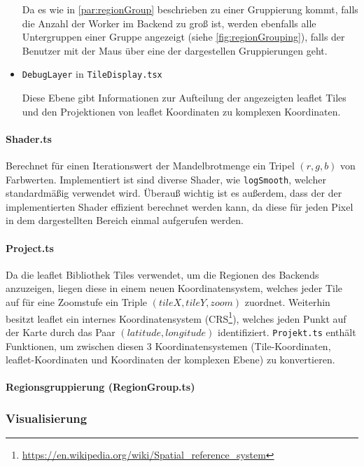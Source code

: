 \begin{itemize}
	      Da es wie in \autoref{par:regionGroup} beschrieben zu einer Gruppierung kommt, falls die Anzahl der Worker im Backend zu
	      groß ist, werden ebenfalls alle Untergruppen einer Gruppe angezeigt (siehe \autoref{fig:regionGrouping}), falls der Benutzer mit der Maus über eine der
	      dargestellen Gruppierungen geht.
	\item \verb|DebugLayer| in \verb|TileDisplay.tsx|

	      Diese Ebene gibt Informationen zur Aufteilung der angezeigten leaflet Tiles und den Projektionen von
	      leaflet Koordinaten zu komplexen Koordinaten.
\end{itemize}

\paragraph{Shader.ts}\label{par:shader}
Berechnet für einen Iterationswert der Mandelbrotmenge ein Tripel \( (r,g,b) \) von Farbwerten.
Implementiert ist sind diverse Shader, wie \verb|logSmooth|, \verb|| welcher standardmäßig verwendet wird.
Überauß wichtig ist es außerdem, dass der der implementierten Shader effizient berechnet werden kann, da diese 
für jeden Pixel in dem dargestellten Bereich einmal aufgerufen werden.

\paragraph{Project.ts}
Da die leaflet Bibliothek Tiles verwendet, um die Regionen des Backends anzuzeigen, liegen diese in
einem neuen Koordinatensystem, welches jeder Tile auf für eine Zoomstufe ein Triple \( (tileX, tileY, zoom) \) zuordnet.
Weiterhin besitzt leaflet ein internes Koordinatensystem (CRS\footnote{\url{https://en.wikipedia.org/wiki/Spatial_reference_system}}),
welches jeden Punkt auf der Karte durch das Paar \( (latitude, longitude) \) identifiziert.
\verb|Projekt.ts| enthält Funktionen, um zwischen diesen 3 Koordinatensystemen
(Tile-Koordinaten, leaflet-Koordinaten und Koordinaten der komplexen Ebene) zu konvertieren.

\paragraph{Regionsgruppierung (RegionGroup.ts)}\label{par:regionGroup}

\subsubsection{Visualisierung}


